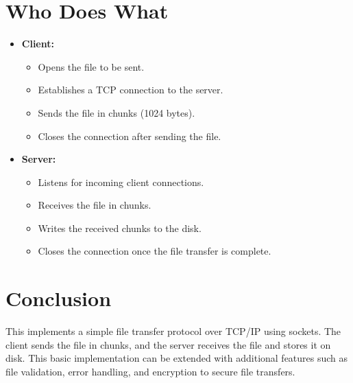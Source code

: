 \documentclass{article}
\begin{document}
\clearpage
\section{Who Does What}
\begin{itemize}
    \item \textbf{Client:}
    \begin{itemize}
        \item Opens the file to be sent.
        \item Establishes a TCP connection to the server.
        \item Sends the file in chunks (1024 bytes).
        \item Closes the connection after sending the file.
    \end{itemize}
    \item \textbf{Server:}
    \begin{itemize}
        \item Listens for incoming client connections.
        \item Receives the file in chunks.
        \item Writes the received chunks to the disk.
        \item Closes the connection once the file transfer is complete.
    \end{itemize}
\end{itemize}

\section{Conclusion}
This implements a simple file transfer protocol over TCP/IP using sockets. The client sends the file in chunks, and the server receives the file and stores it on disk. This basic implementation can be extended with additional features such as file validation, error handling, and encryption to secure file transfers.
\end{document}
